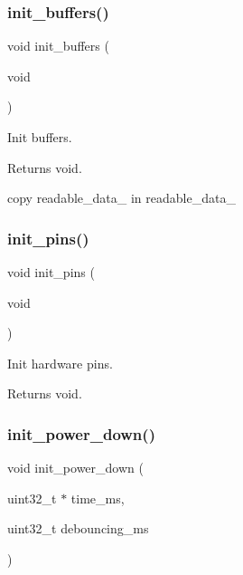 \subsubsection{\texorpdfstring{init\+\_\+buffers()}{init\_buffers()}}
{\footnotesize\ttfamily void init\+\_\+buffers (\begin{DoxyParamCaption}\item[{void}]{ }\end{DoxyParamCaption})}



Init buffers. 

\begin{DoxyReturn}{Returns}
void. 
\end{DoxyReturn}
copy readable\+\_\+data\+\_ in readable\+\_\+data\+\_ \mbox{\label{i2c-th_8h_aa9c113540346b54d49b2a596e6ba8480}} 
\subsubsection{\texorpdfstring{init\+\_\+pins()}{init\_pins()}}
{\footnotesize\ttfamily void init\+\_\+pins (\begin{DoxyParamCaption}\item[{void}]{ }\end{DoxyParamCaption})}



Init hardware pins. 

\begin{DoxyReturn}{Returns}
void. 
\end{DoxyReturn}
\mbox{\label{i2c-th_8h_afb98a0f07c30784284f48271ffe02b97}} 
\subsubsection{\texorpdfstring{init\+\_\+power\+\_\+down()}{init\_power\_down()}}
{\footnotesize\ttfamily void init\+\_\+power\+\_\+down (\begin{DoxyParamCaption}\item[{uint32\+\_\+t $\ast$}]{time\+\_\+ms,  }\item[{uint32\+\_\+t}]{debouncing\+\_\+ms }\end{DoxyParamCaption})}



